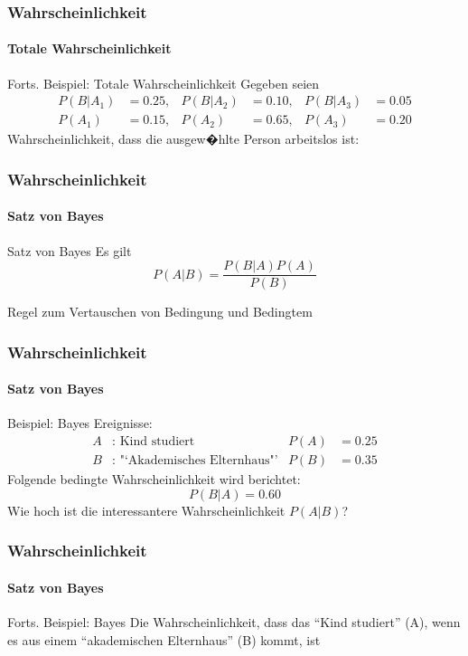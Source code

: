 \documentclass[12pt,show notes]{beamer}
\begin{document}
\begin{frame}
\frametitle{Wahrscheinlichkeit}
\framesubtitle{Totale Wahrscheinlichkeit}
\begin{exampleblock}{Forts. Beispiel: Totale Wahrscheinlichkeit}
Gegeben seien
\begin{align*}
P(B|A_{1}) &=0.25,&P(B|A_{2}) &=0.10,& P(B|A_{3}) &=0.05\\
P(A_1) &=0.15,    &P(A_2)     &=0.65,& P(A_3) &=0.20 
\end{align*}
Wahrscheinlichkeit, dass die ausgew�hlte Person arbeitslos ist:
\end{exampleblock}
\end{frame}

\begin{frame}
\frametitle{Wahrscheinlichkeit}
\framesubtitle{Satz von Bayes}
\begin{block}{Satz von Bayes}
Es gilt
\[ P(A|B)=\frac{P(B|A) P(A)}{P(B)} \]
\end{block}
\medskip
Regel zum Vertauschen von Bedingung und Bedingtem
\end{frame}

\begin{frame}
\frametitle{Wahrscheinlichkeit}
\framesubtitle{Satz von Bayes}
\begin{exampleblock}{Beispiel: Bayes}
Ereignisse:
\begin{align*}
A &:\text{ Kind studiert} &P(A)&=0.25\\
B &:\text{ "`Akademisches Elternhaus"'}&P(B)&=0.35
\end{align*}
Folgende bedingte Wahrscheinlichkeit wird berichtet:
\[ P(B|A) =0.60 \]
Wie hoch ist die interessantere Wahrscheinlichkeit  $P(A|B)$?
\end{exampleblock}
\end{frame}

\begin{frame}
\frametitle{Wahrscheinlichkeit}
\framesubtitle{Satz von Bayes}
\begin{exampleblock}{Forts. Beispiel: Bayes}
Die Wahrscheinlichkeit, dass das "`Kind studiert"' (A), wenn es aus einem 
"`akademischen Elternhaus"' (B) kommt, ist
\end{exampleblock}
\end{frame}
\end{document}
